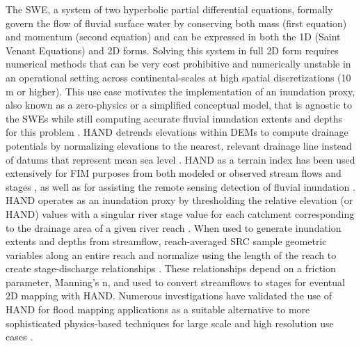 \documentclass[water,article,submit,pdftex,moreauthors]{dependencies/Definitions/mdpi}
\begin{document}
The \ac{SWE}, a system of two hyperbolic partial differential equations, formally govern the flow of fluvial surface water by conserving both mass (first equation) and momentum (second equation) and can be expressed in both the \ac{1D} (Saint Venant Equations) and \ac{2D} forms.
Solving this system in full \ac{2D} form requires numerical methods that can be very cost prohibitive and numerically unstable in an operational setting across continental-scales at high spatial discretizations (10 \ac{m} or higher).
This use case motivates the implementation of an inundation proxy, also known as a zero-physics or a simplified conceptual model, that is agnostic to the \acp{SWE} while still computing accurate fluvial inundation extents and depths for this problem \cite{teng2015rapid,bates2000simple}.
\ac{HAND} detrends elevations within \acp{DEM} to compute drainage potentials by normalizing elevations to the nearest, relevant drainage line instead of datums that represent mean sea level \cite{renno2008hand,nobre2011height,nobre2016hand}.
\ac{HAND} as a terrain index has been used extensively for \ac{FIM} purposes from both modeled or observed stream flows and stages \cite{nobre2016hand,afshari2018comparison,garousi2019terrain,johnson2019integrated,zheng2018geoflood,zheng2018river,zhang2018comparative,teng2015rapid,li2022accounting,li2020evaluation}, as well as for assisting the remote sensing detection of fluvial inundation \cite{aristizabal2020high,shastry2019using,aristizabal2021mapping,huang2017comparison,twele2016sentinel}.
\ac{HAND} operates as an inundation proxy by thresholding the relative elevation (or \ac{HAND}) values with a singular river stage value for each catchment corresponding to the drainage area of a given river reach \cite{nobre2016hand,garousi2019terrain,johnson2019integrated,zheng2018geoflood,teng2015rapid,li2020evaluation,liu2016cybergis,maidment2017conceptual,liu2018cybergis,liu2020height,liu2018review}.
When used to generate inundation extents and depths from streamflow, reach-averaged \ac{SRC} sample geometric variables along an entire reach and normalize using the length of the reach to create stage-discharge relationships \cite{zheng2018river,aristizabal2022extending,godbout2019error}.
These relationships depend on a friction parameter, Manning's n, and used to convert streamflows to stages for eventual \ac{2D} mapping with \ac{HAND}.
Numerous investigations have validated the use of \ac{HAND} for flood mapping applications as a suitable alternative to more sophisticated physics-based techniques for large scale and high resolution use cases \cite{johnson2019integrated,li2020evaluation,li2022comparative,aristizabal2022extending,nobre2016hand,godbout2019error,afshari2018comparison,zhang2018comparative,teng2015rapid,teng2017flood,diehl2021improving,hocini2021performance,bates2003optimal}.
\end{document}
